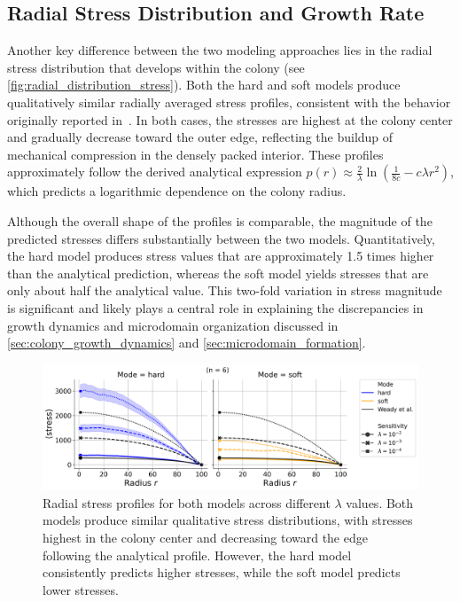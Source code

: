 \documentclass[conference]{IEEEtran}
\begin{document}
\subsection{Radial Stress Distribution and Growth Rate}

Another key difference between the two modeling approaches lies in the radial stress distribution that develops within the colony (see \autoref{fig:radial_distribution_stress}). Both the hard and soft models produce qualitatively similar radially averaged stress profiles, consistent with the behavior originally reported in~\cite{Weady2024}. In both cases, the stresses are highest at the colony center and gradually decrease toward the outer edge, reflecting the buildup of mechanical compression in the densely packed interior. These profiles approximately follow the derived analytical expression $p(r) \approx \frac{2}{\lambda} \ln\left(\frac{1}{8 c} - c\lambda r^2 \right)$, which predicts a logarithmic dependence on the colony radius.

Although the overall shape of the profiles is comparable, the magnitude of the predicted stresses differs substantially between the two models. Quantitatively, the hard model produces stress values that are approximately 1.5 times higher than the analytical prediction, whereas the soft model yields stresses that are only about half the analytical value. This two-fold variation in stress magnitude is significant and likely plays a central role in explaining the discrepancies in growth dynamics and microdomain organization discussed in \autoref{sec:colony_growth_dynamics} and \autoref{sec:microdomain_formation}.

\begin{figure}[b]
    \centering
    \includegraphics[width=\linewidth]{figures/comparison_plots/combined_stress_shared.png}
    \caption{Radial stress profiles for both models across different $\lambda$ values. Both models produce similar qualitative stress distributions, with stresses highest in the colony center and decreasing toward the edge following the analytical profile. However, the hard model consistently predicts higher stresses, while the soft model predicts lower stresses.}
    \label{fig:radial_distribution_stress}
\end{figure}
\end{document}
